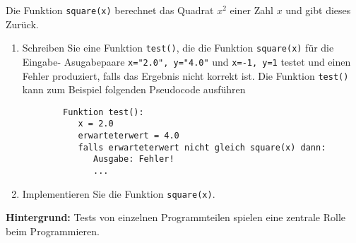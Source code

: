 Die Funktion \verb|square(x)| berechnet das Quadrat $x^2$ einer Zahl $x$ und gibt dieses Zurück. 
\begin{enumerate}
	\item Schreiben Sie eine Funktion \verb|test()|, die die Funktion \verb|square(x)| für die Eingabe- Asugabepaare 
	\verb|x="2.0", y="4.0"| und \verb|x=-1, y=1| testet und einen Fehler produziert, falls das Ergebnis nicht korrekt ist. Die Funktion \verb|test()| kann zum Beispiel folgenden Pseudocode ausführen
	\begin{lstlisting}
		Funktion test():
		   x = 2.0
		   erwarteterwert = 4.0
		   falls erwarteterwert nicht gleich square(x) dann:
		      Ausgabe: Fehler! 
		      ... \end{lstlisting}
	
	\item Implementieren Sie die Funktion \verb|square(x)|.
\end{enumerate}
\textbf{Hintergrund: } Tests von einzelnen Programmteilen spielen eine zentrale Rolle beim Programmieren. \\